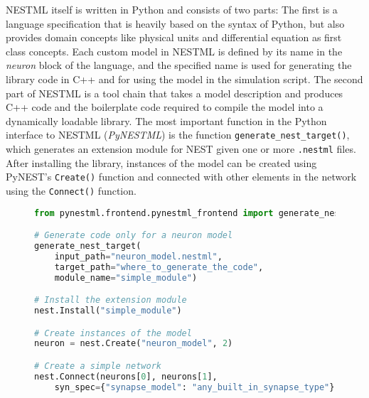 NESTML itself is written in Python and consists of two parts: The first is a language specification that is heavily based on the syntax of Python, but also provides domain concepts like physical units and differential equation as first class concepts. Each custom model in NESTML is defined by its name in the \emph{neuron} block of the language, and the specified name is used for generating the library code in C++ and for using the model in the simulation script. The second part of NESTML is a tool chain that takes a model description and produces C++ code and the boilerplate code required to compile the model into a dynamically loadable library. The most important function in the Python interface to NESTML (\emph{PyNESTML}) is the function \texttt{generate\_nest\_target()}, which generates an extension module for NEST given one or more \texttt{.nestml} files. After installing the library, instances of the model can be created using PyNEST's \texttt{Create()} function and connected with other elements in the network using the \texttt{Connect()} function.

\vspace{2em}
\begin{figure}[ht!]
\centering
\begin{lstlisting}[language=Python, label=lst:nestml_without_synapse, caption={Generating extension module code: The \texttt{generate\_nest\_target()} call for only a neuron model. The minimum required parameter of the function is the \texttt{input\_path} that points to the location of the model. Once the code is generated, the built libraries can be loaded into NEST using the \texttt{Install} function by providing the name of the module (\emph{simple\_module}). Once the model is installed in NEST, we can create instances of the model by calling the \texttt{Create()} function with the model name that was given in the \texttt{neuron} block in the NESTML file.}, captionpos=b]
from pynestml.frontend.pynestml_frontend import generate_nest_target

# Generate code only for a neuron model
generate_nest_target(
    input_path="neuron_model.nestml",
    target_path="where_to_generate_the_code",
    module_name="simple_module")

# Install the extension module
nest.Install("simple_module")

# Create instances of the model
neuron = nest.Create("neuron_model", 2)

# Create a simple network
nest.Connect(neurons[0], neurons[1],
    syn_spec={"synapse_model": "any_built_in_synapse_type"})
\end{lstlisting}
\end{figure}


